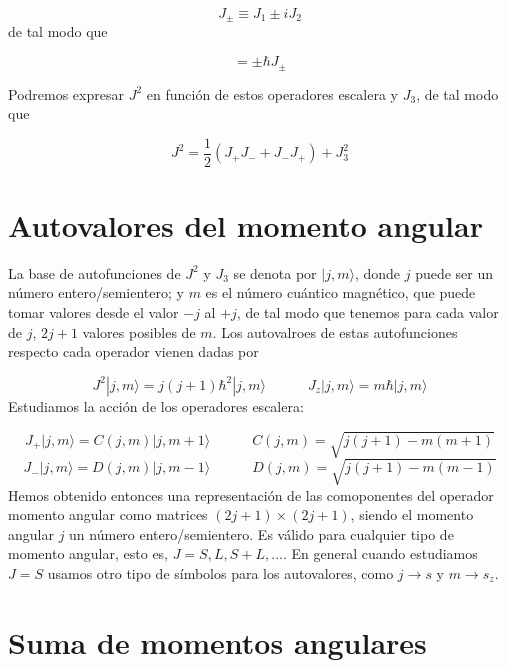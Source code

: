 \documentclass[12pt]{book}
\numberwithin{equation}{chapter}
\numberwithin{figure}{chapter}
\newcommand{\tquad}{\quad \quad \quad}
\newcommand{\parentesis}[1]{\left( #1  \right)}
\begin{document}
\begin{equation}
J_\pm \equiv J_1 \pm i J_2
\end{equation}
de tal modo que

\begin{equation}
[J_3,J_{\pm}] = \pm \hbar J_\pm
\end{equation}

Podremos expresar $J^2$ en función de estos operadores escalera y $J_3$, de tal modo que

\begin{equation}
J^2 = \frac{1}{2} \parentesis{J_+J_- + J_-J_+} + J_3^2
\end{equation}

\section{Autovalores del momento angular}

La base de autofunciones de $J^2$ y $J_3$ se denota por $|j,m\rangle$, donde $j$ puede ser un número entero/semientero; y $m$ es el número cuántico magnético, que puede tomar valores desde el valor $-j$ al $+j$, de tal modo que tenemos para cada valor de $j$, $2j+1$ valores posibles de $m$. Los autovalroes de estas autofunciones respecto cada operador vienen dadas por

\begin{equation}
J^2 |j,m\rangle =  j (j+1)\hbar^2 |j,m\rangle \tquad J_z |j,m\rangle = m \hbar |j,m\rangle
\end{equation}
Estudiamos la acción de los operadores escalera:

\begin{equation}
J_+ |j,m\rangle = C(j,m) |j,m+1\rangle  \tquad C(j,m) = \sqrt{j(j+1)-m(m+1)}
\end{equation}
\begin{equation}
J_- |j,m\rangle = D(j,m) |j,m-1\rangle  \tquad D(j,m) = \sqrt{j(j+1)-m(m-1)}
\end{equation}
Hemos obtenido entonces una representación de las comoponentes del operador momento angular como matrices $(2j+1)\times(2j+1)$, siendo el momento angular $j$ un número entero/semientero. Es válido para cualquier tipo de momento angular, esto es, $J=S,L,S+L,...$. En general cuando estudiamos $J=S$ usamos otro tipo de símbolos para los autovalores, como $j\rightarrow s$ y $m\rightarrow s_z$.

\section{Suma de momentos angulares}
\end{document}
